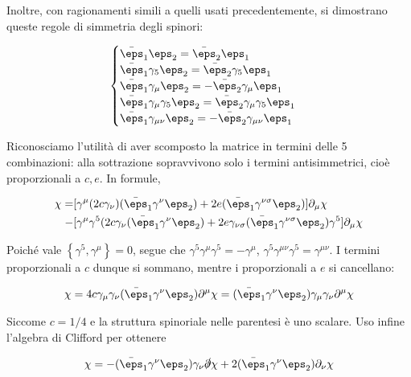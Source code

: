 \documentclass{report}
\begin{document}
Inoltre, con ragionamenti simili a quelli usati precedentemente, si dimostrano queste regole di simmetria degli spinori: 

\begin{align}
    \begin{cases}
        \bar{\eps}_1 \eps_2 = \bar{\eps}_2\eps_1 \\ 
        \bar{\eps}_1 \gamma_5 \eps_2 = \bar{\eps}_2\gamma_5\eps_1 \\
        \bar{\eps}_1 \gamma_\mu \eps_2 = -\bar{\eps}_2\gamma_\mu \eps_1 \\
        \bar{\eps}_1 \gamma_\mu \gamma_5 \eps_2 = \bar{\eps}_2 \gamma_\mu \gamma_5 \eps_1 \\
        \bar{\eps}_1 \gamma_{\mu\nu}\eps_2 = -\bar{\eps}_2 \gamma_{\mu\nu}\eps_1 
    \end{cases}
\end{align}

Riconosciamo l'utilità di aver scomposto la matrice in termini delle 5 combinazioni: alla sottrazione sopravvivono solo i termini antisimmetrici, cioè proporzionali a \(c, e\). In formule, 

\begin{align}
    [\delta_1, \delta_2]\chi = &[\gamma^\mu (2c\gamma_\nu)(\bar{\eps}_1\gamma^\nu \eps_2) + 2e(\bar{\eps}_1\gamma^{\nu\sigma}\eps_2)]\partial_\mu \chi \notag \\
    -&[\gamma^\mu\gamma^5 (2c\gamma_\nu (\bar{\eps}_1\gamma^\nu \eps_2) + 2e\gamma_{\nu\sigma}(\bar{\eps}_1 \gamma^{\nu\sigma}\eps_2)\gamma^5]\partial_\mu \chi
\end{align}

Poiché vale \(\left\{\gamma^5, \gamma^\mu \right\} = 0\), segue che \(\gamma^5 \gamma^\mu \gamma^5 = -\gamma^\mu\), \(\gamma^5 \gamma^{\mu\nu}\gamma^5 = \gamma^{\mu\nu}\). I termini proporzionali a \(c\) dunque si sommano, mentre i proporzionali a \(e\) si cancellano: 

\begin{align}
    [\delta_1, \delta_2]\chi = 4c\gamma_\mu \gamma_\nu(\bar{\eps}_1 \gamma^\nu \eps_2)\partial^\mu \chi = (\bar{\eps}_1 \gamma^\nu \eps_2)\gamma_\mu \gamma_\nu\partial^\mu \chi 
\end{align}

Siccome \(c = 1/4\) e la struttura spinoriale nelle parentesi è uno scalare. Uso infine l'algebra di Clifford per ottenere 

\begin{align}
    [\delta_1, \delta_2]\chi = -(\bar{\eps}_1 \gamma^\nu \eps_2)\gamma_\nu \slashed{\partial}\chi + 2(\bar{\eps}_1\gamma^\nu \eps_2)\partial_\nu \chi
\end{align}
\end{document}
